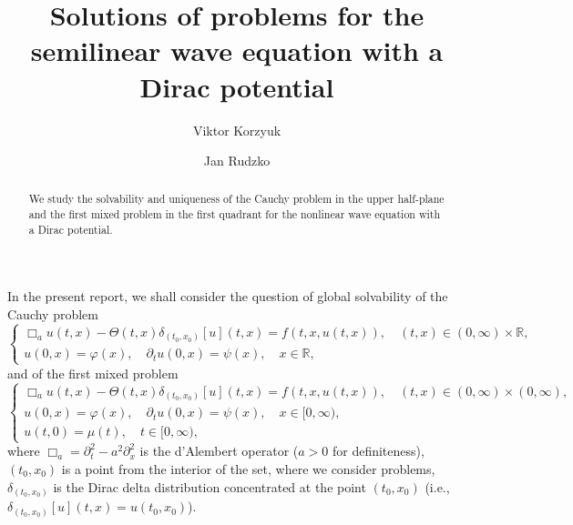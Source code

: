 \documentclass[12pt]{llncs}
\begin{document}
\fi
%
\title{Solutions of problems for the semilinear wave equation with a Dirac potential}
\author{Viktor Korzyuk  \and  Jan Rudzko
}

\maketitle

\begin{abstract}
  We study the solvability and uniqueness of the Cauchy problem in the upper half-plane and the first mixed problem in the first quadrant for the nonlinear wave equation with a Dirac potential.
  
\end{abstract}


In the present report, we shall consider the question of global solvability of the Cauchy problem
\begin{equation}\label{korzyuk_cauchy_problem}
    \begin{cases} 
      \Box_a u(t,x) - \Theta(t, x) \delta_{(t_0, x_0)}[u](t, x) = f(t,x,u(t,x)), \quad (t,x) \in (0, \infty) \times \mathbb{R}, \\
      u(0, x) = \varphi(x), \quad \partial_t u(0, x) = \psi(x), \quad x \in \mathbb{R},
    \end{cases}
\end{equation}
and of the first mixed problem
\begin{equation}\label{korzyuk_fm_problem}
  \begin{cases} 
    \Box_a u(t,x) - \Theta(t, x) \delta_{(t_0, x_0)}[u](t, x) = f(t,x,u(t,x)), \quad (t,x) \in (0, \infty) \times (0, \infty), \\
    u(0, x) = \varphi(x), \quad \partial_t u(0, x) = \psi(x), \quad x \in [0, \infty), \\
    u(t, 0) = \mu(t), \quad t \in [0, \infty),
  \end{cases}
\end{equation}
where $\Box_a = \partial_t^2 - a^2 \partial_x^2$ is the d'Alembert operator ($a > 0$ for definiteness), $(t_0, x_0)$ is a point from the interior of the set, where we consider problems, $\delta_{(t_0, x_0)}$ is the Dirac delta distribution concentrated at the point $(t_0, x_0)$ (i.e., $\delta_{(t_0, x_0)}[u](t, x) = u(t_0, x_0)$).  
\end{document}
